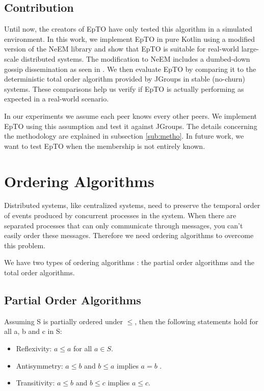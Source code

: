 \documentclass[10pt,conference,a4paper]{IEEEtran}
\begin{document}
\subsection{Contribution}
Until now, the creators of EpTO have only tested this algorithm in a simulated environment. In this work, we implement EpTO in pure Kotlin using a modified version of the NeEM library \autocite{neem} and show that EpTO is suitable for real-world large-scale distributed systems. The modification to NeEM includes a dumbed-down gossip dissemination as seen in \autocite{matos2015epto}. We then evaluate EpTO by comparing it to the deterministic total order algorithm provided by JGroups  \autocite{jgroups} in stable (no-churn) systems. These comparisons help us verify if EpTO is actually performing as expected in a real-world scenario.
\par
In our experiments we assume each peer knows every other peers. We implement EpTO using this assumption and test it against JGroups. The details concerning the methodology are explained in subsection \ref{sub:metho}. In future work, we want to test EpTO when the membership is not entirely known.

\section{Ordering Algorithms}
Distributed systems, like centralized systems, need to preserve the temporal order of events produced by concurrent processes in the system. When there are separated processes that can only communicate through messages, you can’t easily order these messages.
Therefore we need ordering algorithms to overcome this problem.
\par
We have two types of ordering algorithms \autocite{lamport1978time}: the partial order algorithms and the total order algorithms.
\subsection{Partial Order Algorithms}
Assuming S is partially ordered under $\leq$, then the following statements hold for all a, b and c in S:
\begin{itemize}
	\item Reflexivity: $a \leq a$ for all $a \in S$.
	\item Antisymmetry: $a \leq b$ and $b \leq a$ implies $a=b$ .
	\item Transitivity: $a \leq b$  and $b \leq c$  implies $a \leq c$.
\end{itemize}
\end{document}
